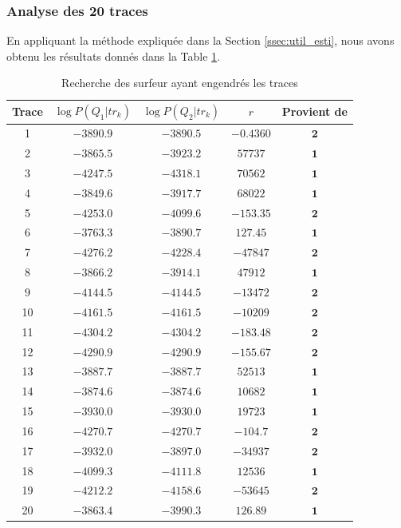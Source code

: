 \documentclass[a4paper,titlepage]{report}
\begin{document}
\subsubsection{Analyse des 20 traces}
En appliquant la méthode expliquée dans la Section \ref{ssec:util_esti}, nous avons obtenu les résultats donnés dans la Table \ref{tab:surf_trace}.
\begin{table}[ht]
	\center
	\begin{tabular}{|c|cccc|}
		\hline
		Trace & $\log P(Q_1|tr_k)$ & $\log P(Q_2|tr_k)$  & $r$ & Provient de \\
		\hline
		1 & $-3890.9$ & $-3890.5$ & $-0.4360$ & $\mathbf{2}$ \\
		2 & $-3865.5$ & $-3923.2$ & $57737$ & $\mathbf{1}$ \\
		3 & $-4247.5 $ & $-4318.1$ & $70562$ & $\mathbf{1}$ \\
		4 & $-3849.6 $ & $-3917.7$ & $68022$ & $\mathbf{1}$ \\
		5 & $-4253.0$ & $-4099.6$ & $-153.35$ & $\mathbf{2}$ \\
		6 & $-3763.3$ & $-3890.7$ & $127.45$ & $\mathbf{1}$ \\
		7 & $-4276.2$ & $-4228.4$ & $-47847$ & $\mathbf{2}$ \\
		8 & $-3866.2$ & $-3914.1$ & $47912$ & $\mathbf{1}$ \\
		9 & $-4144.5$ & $ -4144.5$ & $-13472$ & $\mathbf{2}$ \\
		10 & $-4161.5$ & $-4161.5$ & $-10209$ & $\mathbf{2}$ \\
		11 & $-4304.2$ & $-4304.2$ & $-183.48$ & $\mathbf{2}$ \\
		12 & $-4290.9 $ & $-4290.9$ & $-155.67$ & $\mathbf{2}$ \\
		13 & $-3887.7$ & $-3887.7$ & $52513$ & $\mathbf{1}$ \\
		14 & $-3874.6$ & $-3874.6$ & $10682$ & $\mathbf{1}$ \\
		15 & $-3930.0$ & $-3930.0$ & $19723$ & $\mathbf{1}$ \\
		16 & $-4270.7$ & $-4270.7$ & $-104.7$ & $\mathbf{2}$ \\
		17 & $-3932.0$ & $-3897.0 $ & $-34937$ & $\mathbf{2}$ \\
		18 & $-4099.3$ & $-4111.8$ & $12536$ & $\mathbf{1}$ \\
		19 & $-4212.2$ & $-4158.6$ & $-53645$ & $\mathbf{2}$ \\
		20 & $-3863.4$ & $-3990.3$ & $126.89$ & $\mathbf{1}$ \\
		\hline
	\end{tabular}
	\caption{Recherche des surfeur ayant engendrés les traces}
	\label{tab:surf_trace}
\end{table}
\end{document}
